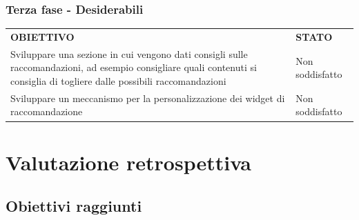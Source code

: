 \documentclass[a4paper, 12pt, twoside, openright]{book}
\begin{document}
\subsection{Terza fase - Desiderabili}
\begin{tabular}{ m{26em} | m{5em} }
	\rowcolor{gray!50}
	\textbf{OBIETTIVO} & \textbf{STATO}\\
	Sviluppare una sezione in cui vengono dati consigli sulle raccomandazioni, ad esempio consigliare quali contenuti si consiglia di togliere dalle possibili raccomandazioni & Non soddisfatto\\
	Sviluppare un meccanismo per la personalizzazione dei widget di raccomandazione & Non soddisfatto\\
\end{tabular}

\chapter{Valutazione retrospettiva}

\section{Obiettivi raggiunti}
\end{document}
